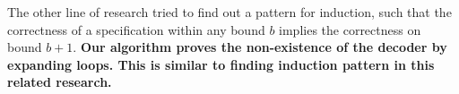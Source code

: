 \documentclass[journal]{IEEEtran}
\begin{document}
The other line of research\cite{kind_tacas99} tried to find out a pattern for induction,
such that the correctness of a specification within any bound $b$ implies the correctness on bound $b+1$.
\textbf{Our algorithm proves the non-existence of the decoder by expanding loops.
This is similar to finding induction pattern in this related research.}


%
%
%
%
%
%
\end{document}
